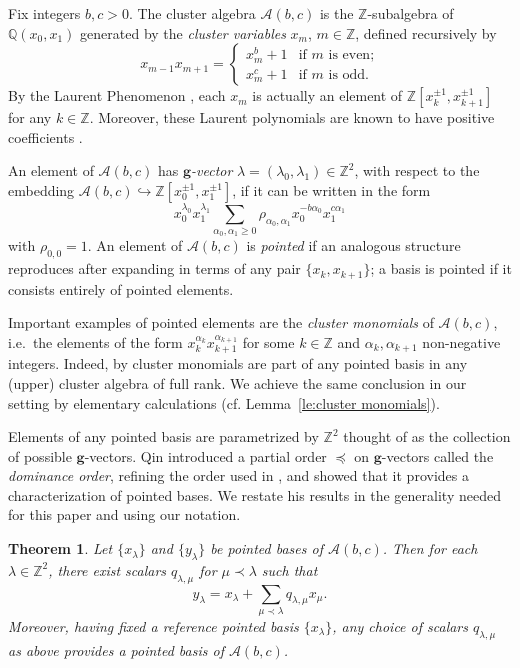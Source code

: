 \documentclass[pdflatex,sn-mathphys]{sn-jnl}%
\theoremstyle{thmstyleone}%
\newtheorem{theorem}{Theorem}[section]%
\theoremstyle{thmstyletwo}%
\theoremstyle{thmstylethree}%
\newcommand{\bfg}{\boldsymbol{g}}
\newcommand{\cA}{\mathcal{A}}
\newcommand{\QQ}{\mathbb{Q}}
\newcommand{\ZZ}{\mathbb{Z}}
\newcommand{\into}{\hookrightarrow}
\begin{document}
  Fix integers $b,c>0$.
  The cluster algebra $\cA(b,c)$ is the $\ZZ$-subalgebra of $\QQ(x_0,x_1)$ generated by the \emph{cluster variables} $x_m$, $m\in\ZZ$, defined recursively by
  \[
    x_{m-1}x_{m+1}=\begin{cases} x_m^b+1 & \text{if $m$ is even;}\\ x_m^c+1 & \text{if $m$ is odd.} \end{cases}
  \]
  By the Laurent Phenomenon \cite{FZ02}, each $x_m$ is actually an element of $\ZZ[x_k^{\pm1},x_{k+1}^{\pm1}]$ for any $k\in\ZZ$.
  Moreover, these Laurent polynomials are known to have positive coefficients \cite{GHKK18,LLZ14,LS15}.

  An element of $\cA(b,c)$ has \emph{$\bfg$-vector} $\lambda=(\lambda_0,\lambda_1)\in\ZZ^2$, with respect to the embedding ${\cA(b,c)\into\ZZ[x_0^{\pm1},x_{1}^{\pm1}]}$, if it can be written in the form
  \begin{equation}
    \label{eq:pointed}
    x_0^{\lambda_0}x_1^{\lambda_1}\sum\limits_{\alpha_0,\alpha_1 \ge 0} \rho_{\alpha_0,\alpha_1} x_0^{-b\alpha_0} x_1^{c\alpha_1}
  \end{equation}
  with $\rho_{0,0}=1$.
  An element of $\cA(b,c)$ is \emph{pointed} if an analogous structure reproduces after expanding in terms of any pair $\{x_k,x_{k+1}\}$; a basis is pointed if it consists entirely of pointed elements.

  Important examples of pointed elements are the \emph{cluster monomials} of $\cA(b,c)$, i.e.~the elements of the form $x_k^{\alpha_k}x_{k+1}^{\alpha_{k+1}}$ for some $k\in\ZZ$ and $\alpha_k,\alpha_{k+1}$ non-negative integers.
  Indeed, by \cite[Lemma 3.4.12]{Qin19} cluster monomials are part of any pointed basis in any (upper) cluster algebra of full rank.
  We achieve the same conclusion in our setting by elementary calculations (cf. Lemma~\ref{le:cluster monomials}).

  Elements of any pointed basis are parametrized by $\ZZ^2$ thought of as the collection of possible $\bfg$-vectors.
  Qin introduced a partial order $\preceq$ on $\bfg$-vectors called the \emph{dominance order}, refining the order used in \cite[Proposition 4.3]{CILS15}, and showed that it provides a characterization of pointed bases.
  We restate his results in the generality needed for this paper and using our notation.
  \begin{theorem}
    \label{th:dominance}
    \cite[Theorem 1.2.1]{Qin19}
    Let $\{x_\lambda\}$ and $\{y_\lambda\}$ be pointed bases of $\cA(b,c)$.
    Then for each $\lambda\in\ZZ^2$, there exist scalars $q_{\lambda,\mu}$ for $\mu\prec\lambda$ such that
    \[y_\lambda=x_\lambda+\sum_{\mu\prec\lambda} q_{\lambda,\mu} x_\mu.\]
    Moreover, having fixed a reference pointed basis $\{x_\lambda\}$, any choice of scalars $q_{\lambda,\mu}$ as above provides a pointed basis of $\cA(b,c)$.
  \end{theorem}
\end{document}
